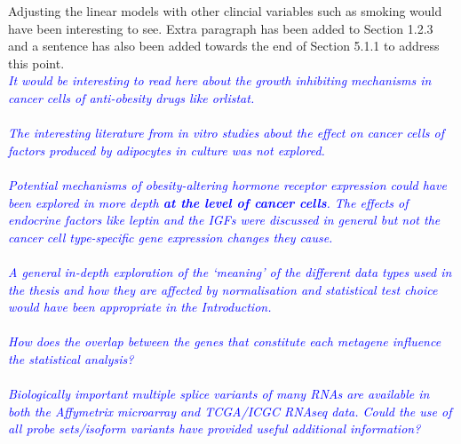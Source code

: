 \documentclass[a4paper, 12pt]{article}
\begin{document}
\noindent
Adjusting the linear models with other clincial variables such as smoking would have been interesting to see.
Extra paragraph has been added to Section 1.2.3 and a sentence has also been added towards the end of Section 5.1.1 to address this point.
\\

\noindent
\textcolor{blue}{
	\textit{It would be interesting to read here about the growth inhibiting mechanisms in cancer cells of anti-obesity drugs like orlistat.
	}
}\\

\noindent
\\

\noindent
\textcolor{blue}{
	\textit{The interesting literature from \textit{in vitro} studies about the effect on cancer cells of factors produced by adipocytes in culture was not explored.
	}
}\\

\noindent
\\

\noindent
\textcolor{blue}{
	\textit{Potential mechanisms of obesity-altering hormone receptor expression could have been explored in more depth \textbf{at the level of cancer cells}.
	The effects of endocrine factors like leptin and the IGFs were discussed in general but not the cancer cell type-specific gene expression changes they cause.
	}
}\\

\noindent
\\

\noindent
\textcolor{blue}{
	\textit{A general in-depth exploration of the `meaning' of the different data types used in the thesis and how they are affected by normalisation and statistical test choice would have been appropriate in the Introduction.
	}
}\\

\noindent
\\

\noindent
\textcolor{blue}{
	\textit{How does the overlap between the genes that constitute each metagene influence the statistical analysis?
	}
}\\

\noindent
\\

\noindent
\textcolor{blue}{
	\textit{Biologically important multiple splice variants of many RNAs are available in both the Affymetrix microarray and TCGA/ICGC RNAseq data.
	Could the use of all probe sets/isoform variants have provided useful additional information?
	}
}\\
\end{document}
